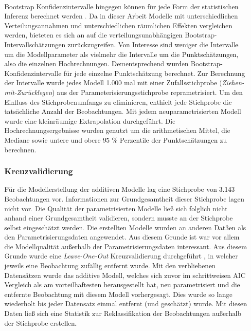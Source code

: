 \documentclass{Vorlage}
\begin{document}
\\Bootstrap Konfidenzintervalle hingegen können für jede Form der statistischen Inferenz berechnet werden \cite{diciccio1996}. Da in dieser Arbeit Modelle mit unterschiedlichen Verteilungsannahmen und unterschiedlichen räumlichen Effekten vergleichen werden, bieteten es sich an auf die verteilungsunabhängigen Bootstrap-Intervallschätzungen zurückzugreifen. Von Interesse sind weniger die Intervalle um die Modellparameter als vielmehr die Intervalle um die Punktschätzungen, also die einzelnen Hochrechnungen. Dementsprechend wurden Bootstrap-Konfidenzintervalle für jede einzelne Punktschätzung berechnet. Zur Berechnung der Intervalle wurde jedes Modell 1.000 mal mit einer Zufallsstichprobe (\textit{Ziehen-mit-Zurücklegen}) aus der Parameterisierungsstichprobe reprametrisiert. Um den Einfluss des Stichprobenumfangs zu eliminieren, enthielt jede Stichprobe die tatsächliche Anzahl der Beobachtungen. Mit jedem neuparametrisierten Modell wurde eine kleinräumige Extrapolation durchgeführt. Die Hochrechnungsergebnisse wurden genutzt um die arithmetischen Mittel, die Mediane sowie untere und obere 95 \% Perzentile der Punktschätzungen zu berechnen.

\subsubsection{Kreuzvalidierung}
Für die Modellerstellung der additiven Modelle lag eine Stichprobe von 3.143 Beobachtungen vor. Informationen zur Grundgesamtheit dieser Stichprobe lagen nicht vor. Die Qualität der parametrisierten Modelle ließ sich folglich nicht anhand einer Grundgesamtheit validieren, sondern musste an der Stichprobe selbst eingeschätzt werden. Die erstellten Modelle wurden an anderen Dat3en als den Parametrisierungsdaten angewendet. Aus diesem Grunde ist war vor allem die Modellqualität außerhalb der Parametrisierungsdaten interessant. Aus diesem Grunde wurde eine \textit{Leave-One-Out} Kreuzvalidierung durchgeführt \cite[p. 149]{fahrmeir2013regression}, in welcher jeweils eine Beobachtung zufällig entfernt wurde. Mit den verbliebenen Datensätzen wurde das additive Modell, welches sich zuvor im schrittweisen AIC Vergleich als am vorteilhaftesten herausgestellt hat, neu parametrisiert und die entfernte Beobachtung mit diesem Modell vorhergesagt. Dies wurde so lange wiederholt bis jeder Datensatz einmal entfernt (und geschätzt) wurde. Mit diesen Daten ließ sich eine Statistik zur Reklassifikation der Beobachtungen außerhalb der Stichprobe erstellen.
\end{document}
